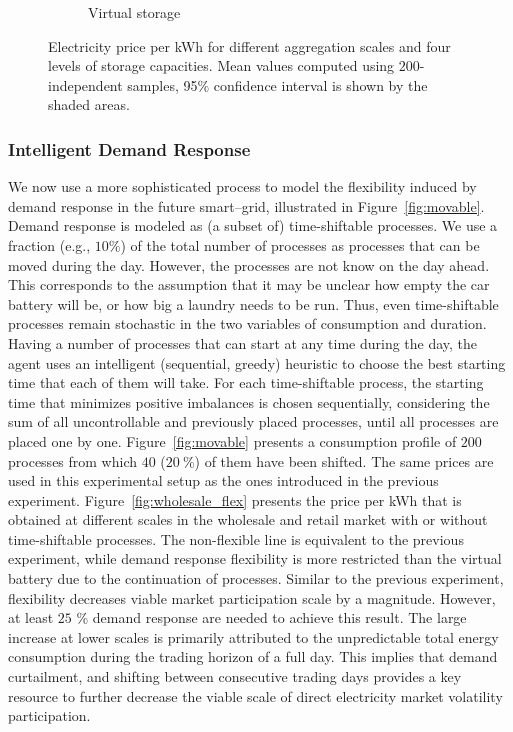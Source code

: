 \documentclass[conference]{IEEEtran}
\begin{document}
\begin{figure}[t!]
\begin{subfigure}[b]{0.32\textwidth}
        \caption{Virtual storage}
        \label{fig:wholesale_betweenDay}
    \end{subfigure}
    \vspace{-0.4cm}
\caption{Electricity price per kWh for different aggregation scales and four levels of storage capacities. Mean values computed using $200$-independent samples, 95$\%$ confidence interval is shown by the shaded areas.}
\end{figure}

\subsubsection{Intelligent Demand Response}

We now use a more sophisticated process to model the flexibility induced by demand response in the future smart--grid, illustrated in Figure~\ref{fig:movable}. Demand response is modeled as (a subset of) time-shiftable processes. We use a fraction (e.g., $10\%$) of the total number of processes as processes that can be moved during the day. However, the processes are not know on the day ahead. This corresponds to the assumption that it may be unclear how empty the car battery will be, or how big a laundry needs to be run. Thus, even time-shiftable processes remain stochastic in the two variables of consumption and duration.
Having a number of processes that can start at any time during the day, the agent uses an intelligent (sequential, greedy) heuristic to choose the best starting time that each of them will take. For each time-shiftable process, the starting time that minimizes positive imbalances is chosen sequentially, considering the sum of all uncontrollable and previously placed processes, until all processes are placed one by one. Figure~\ref{fig:movable} presents a consumption profile of $200$ processes from which $40$ ($20~\%$) of them have been shifted. The same prices are used in this experimental setup as the ones introduced in the previous experiment. Figure~\ref{fig:wholesale_flex} presents the price per kWh that is obtained at different scales in the wholesale and retail market with or without time-shiftable processes. The non-flexible line is equivalent to the previous experiment, while demand response flexibility is more restricted than the virtual battery due to the continuation of processes. Similar to the previous experiment, flexibility decreases viable market participation scale by a magnitude. However, at least $25$ \% demand response are needed to achieve this result.
The large increase at lower scales is primarily attributed to the unpredictable total energy consumption during the trading horizon of a full day. This implies that demand curtailment, and shifting between consecutive trading days provides a key resource to further decrease the viable scale of direct electricity market volatility participation.
\end{document}
